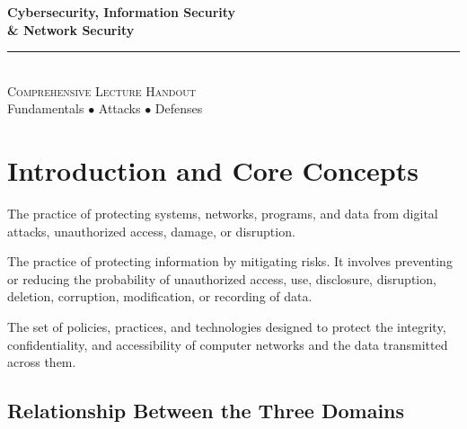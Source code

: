 \documentclass[11pt,a4paper]{article}
\begin{document}
\begin{center}
\vspace*{0.5cm}
{\Huge\bfseries\textcolor{primary}{Cybersecurity, Information Security}}\\[6pt]
{\Huge\bfseries\textcolor{primary}{\& Network Security}}\\[16pt]
{\color{secondary}\rule{0.6\textwidth}{1.5pt}}\\[14pt]
{\Large\textsc{Comprehensive Lecture Handout}}\\[8pt]
{\large\textcolor{gray!70!black}{Fundamentals $\bullet$ Attacks $\bullet$ Defenses}}
\vspace{0.3cm}
\end{center}
\tableofcontents
\newpage

\section{Introduction and Core Concepts}

\begin{definitionbox}[Cybersecurity]
The practice of protecting systems, networks, programs, and data from digital attacks, unauthorized access, damage, or disruption.
\end{definitionbox}

\begin{definitionbox}
The practice of protecting information by mitigating risks. It involves preventing or reducing the probability of unauthorized access, use, disclosure, disruption, deletion, corruption, modification, or recording of data.
\end{definitionbox}

\begin{definitionbox}
The set of policies, practices, and technologies designed to protect the integrity, confidentiality, and accessibility of computer networks and the data transmitted across them.
\end{definitionbox}

\subsection{Relationship Between the Three Domains}
\end{document}
